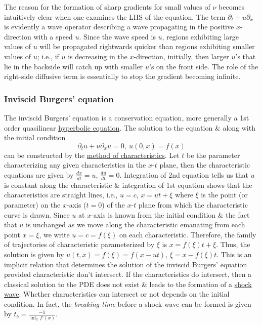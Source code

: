 \documentclass{article}
\begin{document}
The reason for the formation of sharp gradients for small values of $\nu$ becomes intuitively clear when one examines the LHS of the equation. The term $\partial_t + u\partial_x$ is evidently a wave operator describing a wave propagating in the positive $x$-direction with a speed $u$. Since the wave speed is $u$, regions exhibiting large values of $u$ will be propagated rightwards quicker than regions exhibiting smaller values of $u$; i.e., if $u$ is decreasing in the $x$-direction, initially, then larger $u$'s that lie in the backside will catch up with smaller $u$'s on the front side. The role of the right-side diffusive term is essentially to stop the gradient becoming infinite.

\subsubsection{Inviscid Burgers' equation}
The inviscid Burgers' equation is a conservation equation, more generally a 1st order quasilinear \href{https://en.wikipedia.org/wiki/Hyperbolic_equation}{hyperbolic equation}. The solution to the equation \& along with the initial condition
\begin{equation}
	\label{inviscid Burgers}
	\partial_tu + u\partial_xu = 0,\ u(0,x) = f(x)
\end{equation}
can be constructed by the \href{https://en.wikipedia.org/wiki/Method_of_characteristics}{method of characteristics}. Let $t$ be the parameter characterizing any given characteristics in the $x$-$t$ plane, then the characteristic equations are given by $\frac{dx}{dt} = u$, $\frac{du}{dt} = 0$. Integration of 2nd equation tells us that $u$ is constant along the characteristic \& integration of 1st equation shows that the characteristics are straight lines, i.e., $u = c$, $x = ut + \xi$ where $\xi$ is the point (or parameter) on the $x$-axis ($t = 0$) of the $x$-$t$ plane from which the characteristic curve is drawn. Since $u$ at $x$-axis is known from the initial condition \& the fact that $u$ is unchanged as we move along the characteristic emanating from each point $x = \xi$, we write $u = c = f(\xi)$ on each characteristic. Therefore, the family of trajectories of characteristic parameterized by $\xi$ is $x = f(\xi)t + \xi$. Thus, the solution is given by $u(t,x) = f(\xi) = f(x - ut)$, $\xi = x - f(\xi)t$. This is an implicit relation that determines the solution of the inviscid Burgers' equation provided characteristic don't intersect. If the characteristics do intersect, then a classical solution to the PDE does not exist \& leads to the formation of a \href{https://en.wikipedia.org/wiki/Shock_wave}{shock wave}. Whether characteristics can intersect or not depends on the initial condition. In fact, the {\it breaking time} before a shock wave can be formed is given by $t_b = \frac{-1}{\inf_x f'(x)}$.
\end{document}
